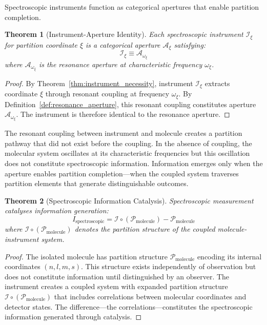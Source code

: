 \documentclass[twocolumn,10pt,a4paper]{article}
\newtheorem{theorem}{Theorem}[section]
\theoremstyle{definition}
\theoremstyle{remark}
\newcommand{\partition}{\mathcal{P}}
\newcommand{\aperture}{\mathcal{A}}
\newcommand{\instrument}{\mathcal{I}}
\begin{document}
Spectroscopic instruments function as categorical apertures that enable partition completion.

\begin{theorem}[Instrument-Aperture Identity]
\label{thm:instrument_aperture}
Each spectroscopic instrument $\instrument_\xi$ for partition coordinate $\xi$ is a categorical aperture $\aperture_\xi$ satisfying:
\begin{equation}
\instrument_\xi \equiv \aperture_{\omega_\xi}
\end{equation}
where $\aperture_{\omega_\xi}$ is the resonance aperture at characteristic frequency $\omega_\xi$.
\end{theorem}

\begin{proof}
By Theorem~\ref{thm:instrument_necessity}, instrument $\instrument_\xi$ extracts coordinate $\xi$ through resonant coupling at frequency $\omega_\xi$. By Definition~\ref{def:resonance_aperture}, this resonant coupling constitutes aperture $\aperture_{\omega_\xi}$. The instrument is therefore identical to the resonance aperture.
\end{proof}

The resonant coupling between instrument and molecule creates a partition pathway that did not exist before the coupling. In the absence of coupling, the molecular system oscillates at its characteristic frequencies but this oscillation does not constitute spectroscopic information. Information emerges only when the aperture enables partition completion—when the coupled system traverses partition elements that generate distinguishable outcomes.

\begin{theorem}[Spectroscopic Information Catalysis]
\label{thm:spec_catalysis}
Spectroscopic measurement catalyses information generation:
\begin{equation}
I_{\mathrm{spectroscopic}} = \instrument \circ (\partition_{\mathrm{molecule}}) - \partition_{\mathrm{molecule}}
\end{equation}
where $\instrument \circ (\partition_{\mathrm{molecule}})$ denotes the partition structure of the coupled molecule-instrument system.
\end{theorem}

\begin{proof}
The isolated molecule has partition structure $\partition_{\mathrm{molecule}}$ encoding its internal coordinates $(n, l, m, s)$. This structure exists independently of observation but does not constitute information until distinguished by an observer. The instrument creates a coupled system with expanded partition structure $\instrument \circ (\partition_{\mathrm{molecule}})$ that includes correlations between molecular coordinates and detector states. The difference—the correlations—constitutes the spectroscopic information generated through catalysis.
\end{proof}
\end{document}
